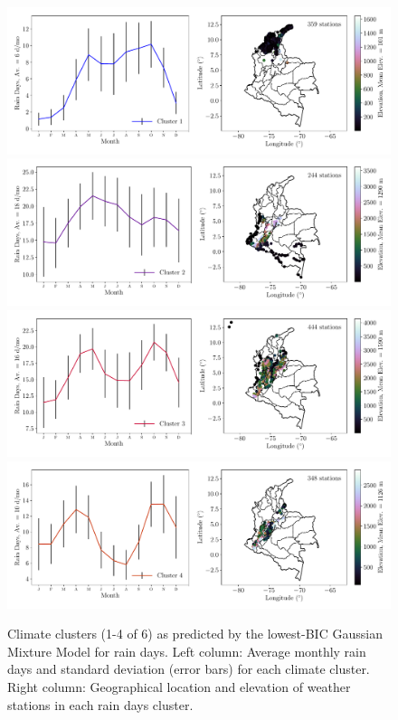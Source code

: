 \documentclass[a4paper,fleqn,usenatbib]{mnras}
\begin{document}
\begin{figure}
\begin{center}
\includegraphics[scale=0.5,trim={0 17 0 18},clip]{gmmd0.pdf}
\includegraphics[scale=0.5,trim={0 17 0 18},clip]{gmmd1.pdf}
\includegraphics[scale=0.5,trim={0 17 0 18},clip]{gmmd2.pdf}
\includegraphics[scale=0.5,trim={0 17 0 18},clip]{gmmd3.pdf}
\caption{Climate clusters (1-4 of 6) as predicted by the lowest-BIC Gaussian Mixture Model for rain days. Left column: Average monthly rain days and standard deviation (error bars) for each climate cluster. Right column: Geographical location and elevation of weather stations in each rain days cluster.}\label{clustd}
\end{center}
\end{figure}
\end{document}
